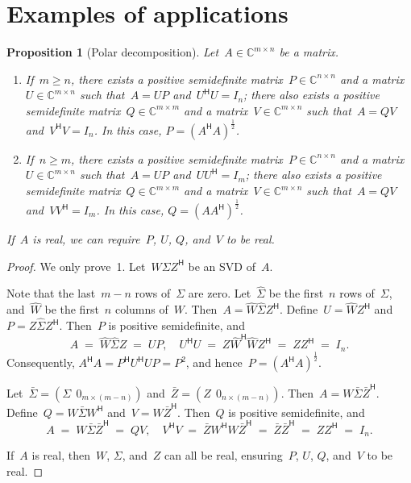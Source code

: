 \documentclass[11pt,a4paper]{article}  %
\numberwithin{equation}{section}
\newtheorem{proposition}{Proposition}%
\theoremstyle{definition}
\def\CC{\mathbb{C}}
\newcommand{\hmt}{{\scriptscriptstyle{{\mathsf{H}}}}}
\begin{document}
\section{Examples of applications}

\begin{proposition}[Polar decomposition]
  \label{th:polar} Let~$A \in \CC^{m\times n}$ be a matrix.
  \begin{enumerate}[leftmargin=1.5em]
    \item If~$m\ge n$, there exists a positive semidefinite matrix~$P \in \CC^{n\times n}$ and
      a matrix~$U\in \CC^{m\times n}$ such that~$A = UP$ and~$U^\hmt U = I_n$; there also exists
      a positive semidefinite matrix~$Q\in \CC^{m\times m}$ and a matrix~$V\in\CC^{m\times n}$ such
      that~$A = QV$ and~$V^\hmt V = I_n$.
      In this case, $P = (A^\hmt A)^{\frac{1}{2}}$.
    \item If~$n\ge m$, there exists a positive semidefinite matrix~$P \in \CC^{n\times n}$ and
      a matrix~$U\in \CC^{m\times n}$ such that~$A = UP$ and~$UU^\hmt = I_m$; there also exists
      a positive semidefinite matrix~$Q\in \CC^{m\times m}$ and a matrix~$V\in\CC^{m\times n}$ such
      that~$A = QV$ and~$V V^\hmt = I_m$. In this case, $Q = (AA^\hmt)^{\frac{1}{2}}$.
  \end{enumerate}
   If~$A$ is real, we can require~$P$, $U$, $Q$, and~$V$ to be real.
\end{proposition}

\begin{proof}
  We only prove~1.
  Let~$ W\Sigma Z^\hmt$ be an SVD of~$A$.

  Note that the last~$m-n$ rows of~$\Sigma$ are zero.
  Let~$\hat{\Sigma}$ be the first~$n$ rows of~$\Sigma$, and~$\hat{W}$ be the first~$n$ columns
  of~$W$. Then~$A = \hat{W}\hat{\Sigma}Z^\hmt $. Define~$U = \hat{W}Z^\hmt$ and~$P
  = Z\hat{\Sigma} Z^\hmt$. Then~$P$ is positive semidefinite, and
  \begin{equation*}
    A \;=\; \hat{W}\hat{\Sigma} Z\;=\; UP,\quad
    U^\hmt U \;=\; Z\hat{W}^\hmt \hat{W} Z^\hmt \;=\;ZZ^\hmt \;=\; I_n.
  \end{equation*}
  Consequently, $A^\hmt A  =  P^\hmt U^\hmt U P = P^2$, and hence~$P = (A^\hmt
  A)^{\frac{1}{2}}$.

  Let~$\bar{\Sigma} = (\Sigma\;\, 0_{m\times(m-n)})$ and~$\bar{Z} = (Z\;\,0_{n\times (m-n)})$.
  Then~$A = W\bar{\Sigma} \bar{Z}^\hmt$. Define~$Q = W\bar{\Sigma} W^\hmt$ and~$V = W\bar{Z}^\hmt$.
  Then~$Q$ is positive semidefinite, and
  \begin{equation*}
    A\;=\; W\bar{\Sigma}\bar{Z}^\hmt \;=\; QV, \quad
    V^\hmt V \;=\; \bar{Z}W^\hmt W \bar{Z}^\hmt \;=\; \bar{Z}\bar{Z}^\hmt \;=\; ZZ^\hmt \;=\; I_n.
  \end{equation*}

  If~$A$ is real, then~$W$, $\Sigma$, and~$Z$ can all be real,
  ensuring~$P$, $U$, $Q$, and~$V$ to be real.
\end{proof}
\end{document}
